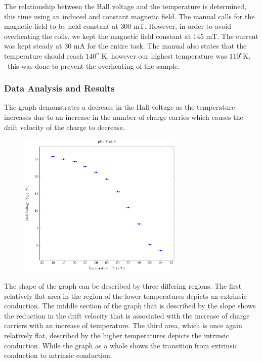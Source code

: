 \documentclass[a4paper]{article}
\begin{document}
\qq The relationship between the Hall voltage and the temperature is
determined, this time using an induced and constant magnetic
field. The manual calls for the magnetic field to be held constant at
300 mT. However, in order to avoid overheating the coils, we kept the
magnetic field constant at 145 mT. The current was kept steady at 30
mA for the entire task. The manual also states that the temperature
should reach $140^o$ K, however our highest temperature was $110^o$K, \
this was done to prevent the overheating of the sample.


\subsubsection{Data Analysis and Results}
\qq The graph demonstrates a decrease in the Hall voltage as the
temperature increases due to an increase in the number of charge
carries which causes the drift velocity of the charge to decrease.

\begin{figure}[H]
\centering
\includegraphics[width=0.7\textwidth]{PGePlots/Task5/pGeTask5.pdf}
\label{task25plot}
\end{figure}

\qq The shape of the graph can be described by three differing
regions. The first relatively flat area in the region of the lower
temperatures depicts an extrinsic conduction. The middle section of
the graph that is described by the slope shows the reduction in the
drift velocity that is associated with the increase of charge carriers
with an increase of temperature. The third area, which is once again
relatively flat, described by the higher temperatures depicts the
intrinsic conduction. While the graph as a whole shows the transition
from extrinsic conduction to intrinsic conduction.
\end{document}
